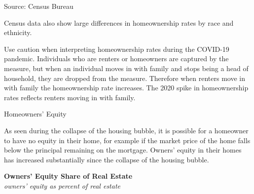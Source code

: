 \documentclass{report}
\makeatletter
\newcommand{\tbllink}[1]{\href{https://raw.githubusercontent.com/bdecon/US-chartbook/master/chartbook/data/#1}{\faTable}}
\newcommand*\short[1]{\expandafter\@gobbletwo\number\numexpr#1\relax}
\newcommand{\shdateaxisticks}{
		date coordinates in=x, axis line style={draw=none},
		xmax={2023-11-30},
		max space between ticks=40,	    
		xtick={{1990-01-01}, {1995-01-01}, {2000-01-01}, 
			{2005-01-01}, {2010-01-01}, {2015-01-01}, {2020-01-01}},
		minor xtick={},
		enlarge y limits={0.06}, enlarge x limits={0.01},
		xticklabel style={align=center, yshift=-2pt}, tick label style={inner sep=0pt},
		}
\newcommand{\stdline}[4]{\addplot[very thick, no markers, color=#1] 
		table [x=#2, y=#3, col sep=comma] {#4};	}
\newcommand{\rbars}{
		\fill[color=black!10] (axis cs:{1990-07-01},\pgfkeysvalueof{/pgfplots/ymin}) rectangle 
			(axis cs:{1991-03-01}, \pgfkeysvalueof{/pgfplots/ymax});
		\fill[color=black!10] (axis cs:{2007-12-01},\pgfkeysvalueof{/pgfplots/ymin}) rectangle 
			(axis cs:{2009-07-01}, \pgfkeysvalueof{/pgfplots/ymax});
		\fill[color=black!10] (axis cs:{2001-03-01},\pgfkeysvalueof{/pgfplots/ymin}) rectangle 
			(axis cs:{2001-11-01}, \pgfkeysvalueof{/pgfplots/ymax});
		\fill[color=black!10] (axis cs:{2020-02-01},\pgfkeysvalueof{/pgfplots/ymin}) rectangle 
			(axis cs:{2020-05-01}, \pgfkeysvalueof{/pgfplots/ymax});}
\makeatother
\begin{document}
{\begin{minipage}{0.43\textwidth}
\footnotesize{Source: Census Bureau} \hfill \tbllink{homeown2.csv} 

\end{minipage}\hspace{6mm}
\begin{minipage}{0.285\textwidth}
\small Census data also show large differences in homeownership rates by race and ethnicity. 


\end{minipage}\hspace{5mm}
\vspace{1mm}

\begin{minipage}{0.76\textwidth}
\small Use caution when interpreting homeownership rates during the COVID-19 pandemic. Individuals who are renters or homeowners are captured by the measure, but when an individual moves in with family and stops being a head of household, they are dropped from the measure. Therefore when renters move in with family the homeownership rate increases. The 2020 spike in homeownership rates reflects renters moving in with family. 
\vspace{1mm}

\normalsize Homeowners' Equity
\vspace*{-1mm}

\small As seen during the collapse of the housing bubble, it is possible for a homeowner to have no equity in their home, for example if the market price of the home falls below the principal remaining on the mortgage. Owners' equity in their homes has increased substantially since the collapse of the housing bubble. 
\end{minipage}

\begin{minipage}{0.265\textwidth}
\small 
\end{minipage}\hspace{7mm}
\begin{minipage}{0.45\textwidth} 
\vspace*{-4mm}

\normalsize \textbf{Owners' Equity Share of Real Estate}\\
\footnotesize{\textit{owners' equity as percent of real estate}}
\vspace{2.9cm}

\hspace{3mm} 


\end{minipage}}
\end{document}
